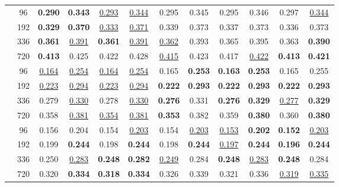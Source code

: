 \begin{table*}[!ht]
\begin{tabular}{c|c|cc|cc|cc|cc|cc}
	\midrule
	\multirow{4}{*}{\rotatebox[origin=c]{90}{\text{ETTm1}}}
		 & 96 &  \textbf{0.290} & \textbf{0.343} &  \underline{0.293} & \underline{0.344} &  0.295 & 0.345 &  0.295 & 0.346 &  0.297 & \underline{0.344} \\
		 & 192 &  \textbf{0.329} & \textbf{0.370} &  \underline{0.333} & \underline{0.371} &  0.339 & 0.373 &  0.337 & 0.373 &  0.336 & 0.373 \\
		 & 336 &  \textbf{0.361} & \underline{0.391} &  \textbf{0.361} & \underline{0.391} &  \underline{0.362} & 0.393 &  0.365 & 0.395 &  0.363 & \textbf{0.390} \\
		 & 720 &  \textbf{0.413} & 0.425 &  0.422 & 0.428 &  \underline{0.415} & 0.423 &  0.417 & \underline{0.422} &  \textbf{0.413} & \textbf{0.421} \\ 
	\midrule
	\multirow{4}{*}{\rotatebox[origin=c]{90}{\text{ETTm2}}}
		 & 96 &  \underline{0.164} & \underline{0.254} &  \underline{0.164} & \underline{0.254} &  0.165 & \textbf{0.253} &  \textbf{0.163} & \textbf{0.253} &  0.165 & 0.255 \\
		 & 192 &  \underline{0.223} & \underline{0.294} &  \underline{0.223} & \underline{0.294} &  \textbf{0.222} & \textbf{0.293} &  \textbf{0.222} & \textbf{0.293} &  \textbf{0.222} & \textbf{0.293} \\
		 & 336 &  0.279 & \underline{0.330} &  0.278 & \underline{0.330} &  \textbf{0.276} & 0.331 &  \textbf{0.276} & \textbf{0.329} &  \underline{0.277} & \textbf{0.329} \\
		 & 720 &  0.358 & \underline{0.381} &  \underline{0.354} & \underline{0.381} &  \textbf{0.353} & 0.382 &  0.359 & \textbf{0.380} &  0.360 & \textbf{0.380} \\ 
	\midrule
	\multirow{4}{*}{\rotatebox[origin=c]{90}{\text{Weather}}}
		 & 96 &  0.156 & 0.204 &  0.154 & \underline{0.203} &  0.154 & \underline{0.203} &  \underline{0.153} & \textbf{0.202} &  \textbf{0.152} & \underline{0.203} \\
		 & 192 &  0.199 & \textbf{0.244} &  0.198 & \textbf{0.244} &  0.198 & \textbf{0.244} &  \underline{0.197} & \textbf{0.244} &  \textbf{0.196} & \textbf{0.244} \\
		 & 336 &  0.250 & \underline{0.283} &  \textbf{0.248} & \textbf{0.282} &  \underline{0.249} & 0.284 &  \textbf{0.248} & \underline{0.283} &  \textbf{0.248} & 0.284 \\
		 & 720 &  0.320 & \textbf{0.334} &  \textbf{0.318} & \textbf{0.334} &  0.326 & 0.339 &  0.321 & 0.336 &  \underline{0.319} & \underline{0.335} \\ 
	\bottomrule
	\end{tabular}
\end{table*}






